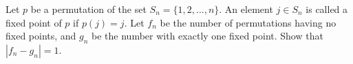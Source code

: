 Let $p$ be a permutation of the set $S_n = \{1, 2, \dots, n\}$.  An element $j \in S_n$ is called a fixed point of $p$ if $p(j) = j$.  Let $f_n$ be the number of permutations having no fixed points, and $g_n$ be the number with exactly one fixed point.  Show that $|f_n - g_n| = 1$.